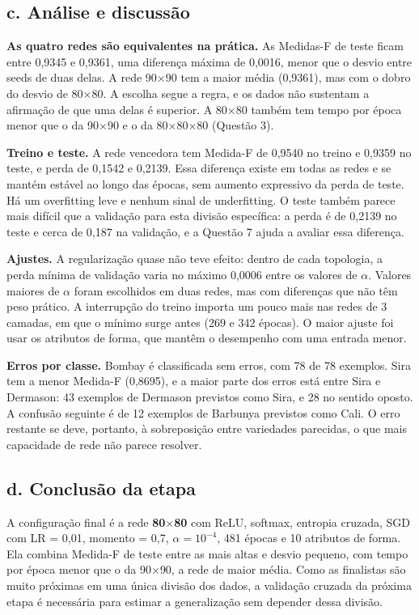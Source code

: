 \subsection*{c. Análise e discussão}

\textbf{As quatro redes são equivalentes na prática.} As Medidas-F de teste ficam entre 0,9345 e 0,9361, uma diferença máxima de 0,0016, menor que o desvio entre seeds de duas delas. A rede 90$\times$90 tem a maior média (0,9361), mas com o dobro do desvio de 80$\times$80. A escolha segue a regra, e os dados não sustentam a afirmação de que uma
delas é superior. A 80$\times$80 também tem tempo por época menor que o da 90$\times$90 e o da 80$\times$80$\times$80 (Questão 3).

\textbf{Treino e teste.} A rede vencedora tem Medida-F de 0,9540 no treino e 0,9359 no teste, e perda de 0,1542 e 0,2139. Essa diferença existe em todas as redes e se mantém estável ao longo das épocas, sem aumento expressivo da perda de teste. Há um overfitting leve e nenhum sinal de underfitting. O teste também parece mais difícil que a validação para esta divisão específica: a perda
é de 0,2139 no teste e cerca de 0,187 na validação, e a Questão 7 ajuda a avaliar essa diferença.

\textbf{Ajustes.} A regularização quase não teve efeito: dentro de cada topologia, a perda mínima de validação varia no máximo 0,0006 entre os valores de $\alpha$. Valores maiores de $\alpha$ foram escolhidos em duas redes, mas com diferenças que não têm peso prático. A interrupção do treino importa um pouco mais nas redes de 3 camadas, em que o mínimo surge antes
(269 e 342 épocas). O maior ajuste foi usar os atributos de forma, que mantêm o desempenho com uma entrada menor.

\textbf{Erros por classe.} Bombay é classificada sem erros, com 78 de 78 exemplos. Sira tem a menor Medida-F (0,8695), e a maior parte dos erros está entre Sira e Dermason: 43 exemplos de Dermason previstos como Sira, e 28 no sentido oposto. A confusão seguinte é de 12 exemplos de Barbunya previstos como Cali. O erro restante se deve, portanto, à sobreposição
entre variedades parecidas, o que mais capacidade de rede não parece resolver.

\subsection*{d. Conclusão da etapa}

A configuração final é a rede \textbf{80$\times$80} com ReLU, softmax, entropia cruzada, SGD com LR = 0,01, momento = 0,7, $\alpha = 10^{-4}$, 481 épocas e 10 atributos de forma. Ela combina Medida-F de teste entre as mais altas e desvio pequeno, com tempo por época menor que o da 90$\times$90, a rede de maior média. Como as finalistas são muito próximas em uma única divisão dos dados,
a validação cruzada da próxima etapa é necessária para estimar a generalização sem depender dessa divisão.

\FloatBarrier
